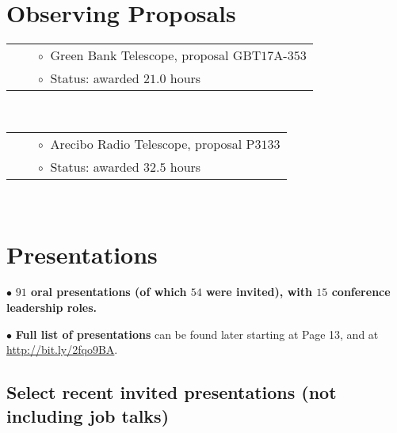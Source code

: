 \documentclass[11pt,letterpaper,sans]{moderncv}
\begin{document}
\vspace{-5mm}
\section{Observing Proposals}

\begin{tabular}{rcl}
&\hspace{0.4cm} &{\color{color1} $\circ\;\;$}Green Bank Telescope, proposal GBT$17$A-$353$ \\
&\hspace{0.4cm} &{\color{color1} $\circ\;\;$}Status: awarded $21.0$ hours
\end{tabular} \\
\begin{tabular}{rcl}
&\hspace{0.4cm} &{\color{color1} $\circ\;\;$}Arecibo Radio Telescope, proposal P$3133$ \\
&\hspace{0.4cm} &{\color{color1} $\circ\;\;$}Status: awarded $32.5$ hours
\end{tabular} \\



\vspace{-4mm}
\section{Presentations}

$\bullet$ \textbf{$91$ oral presentations (of which $54$ were invited), with $15$ conference leadership roles.}


$\bullet$ \textbf{Full list of presentations} can be found later starting at Page 13, and at {\color{color1} \href{http://bit.ly/2fqo9BA}{http://bit.ly/2fqo9BA}}.

\subsection{Select recent invited presentations (not including job talks)}
\end{document}
